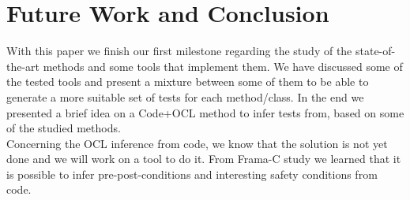 \documentclass[10pt, conference, compsocconf]{IEEEtran}
\begin{document}
\section{Future Work and Conclusion}\label{Concl}
With this paper we finish our first milestone regarding the study of the state-of-the-art methods and some tools that
implement them. We have discussed some of the tested tools and present a mixture between some of them to be able to generate a more suitable
set of tests for each method/class. In the end we presented a brief idea on a Code+OCL method to infer tests from, based on some of the studied methods.\\
Concerning the OCL inference from code, we know that the solution is
not yet done and we will work on a tool to do it.
From Frama-C study we learned that it is possible to infer
pre-post-conditions\cite{moy} and interesting safety conditions from
code.\\




\end{document}
